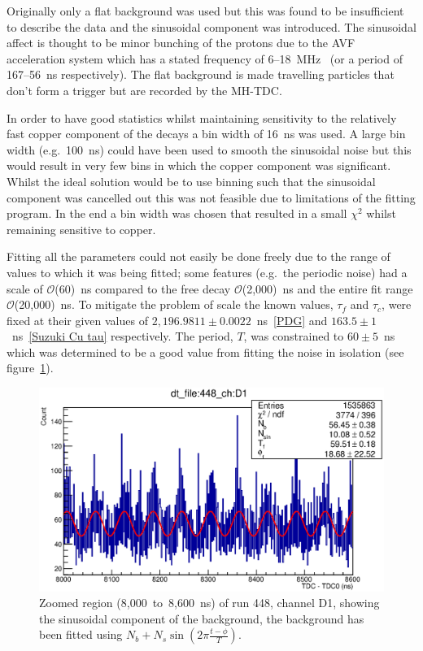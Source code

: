 Originally only a flat background was used but this was found to be insufficient to describe the data and the sinusoidal component was introduced. The sinusoidal affect is thought to be minor bunching of the protons due to the AVF acceleration system which has a stated frequency of 6--18~MHz~\cite{AVF info} (or a period of 167--56~ns respectively). The flat background is made travelling particles that don't form a trigger but are recorded by the MH-TDC.

In order to have good statistics whilst maintaining sensitivity to the relatively fast copper component of the decays a bin width of 16~ns was used. A large bin width (e.g.\ 100~ns) could have been used to smooth the sinusoidal noise but this would result in very few bins in which the copper component was significant. Whilst the ideal solution would be to use binning such that the sinusoidal component was cancelled out this was not feasible due to limitations of the fitting program. In the end a bin width was chosen that resulted in a small \(\chi^2\) whilst remaining sensitive to copper.

Fitting all the parameters could not easily be done freely due to the range of values to which it was being fitted; some features (e.g.\ the periodic noise) had a scale of \(\mathcal{O}\)(60)~ns compared to the free decay \(\mathcal{O}\)(2,000)~ns and the entire fit range \(\mathcal{O}\)(20,000)~ns. To mitigate the problem of scale the known values, \(\tau_{f}\) and \(\tau_{c}\), were fixed at their given values of \(2,196.9811\pm0.0022 \)~ns~\ref{PDG} and \( 163.5\pm1 \)~ns~\ref{Suzuki Cu tau} respectively. The period, \(T\), was constrained to \(60\pm5\)~ns which was determined to be a good value from fitting the noise in isolation (see figure~\ref{fig:images_momentum_spectrum_448_D1_noise_fit}).

\begin{figure}[hptb]
  \centering
    \includegraphics[width=.9\textwidth]{images/momentum_spectrum/448_D1_noise_fit.eps}
  \caption{Zoomed region (8,000~to~8,600~ns) of run 448, channel D1, showing the sinusoidal component of the background, the background has been fitted using \(N_b + N_s\sin(2\pi\frac{t-\phi}{T})\).}
  \label{fig:images_momentum_spectrum_448_D1_noise_fit}
\end{figure}

